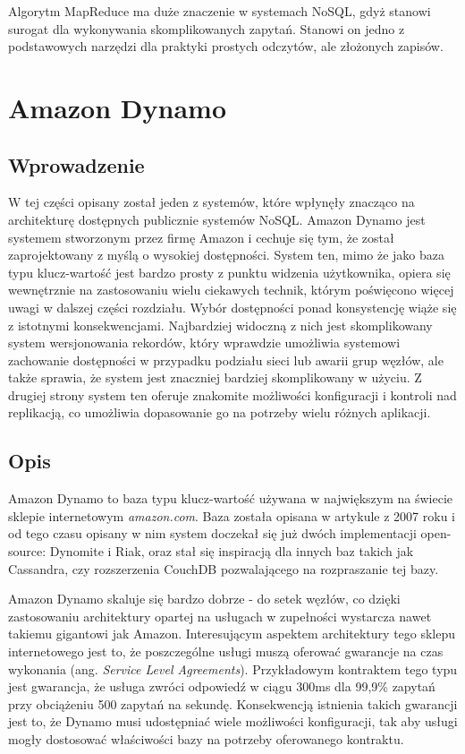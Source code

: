 Algorytm MapReduce ma duże znaczenie w systemach NoSQL, gdyż stanowi surogat dla wykonywania skomplikowanych zapytań.
Stanowi on jedno z podstawowych narzędzi dla praktyki prostych odczytów, ale złożonych zapisów.

\section{Amazon Dynamo}

\subsection*{Wprowadzenie}

W tej części opisany został jeden z systemów, które wpłynęły znacząco na architekturę dostępnych publicznie systemów NoSQL.
Amazon Dynamo jest systemem stworzonym przez firmę Amazon i cechuje się tym, że został zaprojektowany z myślą o wysokiej dostępności.
System ten, mimo że jako baza typu klucz-wartość jest bardzo prosty z punktu widzenia użytkownika, opiera się wewnętrznie na zastosowaniu wielu ciekawych technik, którym poświęcono więcej uwagi w dalszej części rozdziału.
Wybór dostępności ponad konsystencję wiąże się z istotnymi konsekwencjami.
Najbardziej widoczną z nich jest skomplikowany system wersjonowania rekordów, który wprawdzie umożliwia systemowi zachowanie dostępności w przypadku podziału sieci lub awarii grup węzłów, ale także sprawia, że system jest znaczniej bardziej skomplikowany w użyciu.
Z drugiej strony system ten oferuje znakomite możliwości konfiguracji i kontroli nad replikacją, co umożliwia dopasowanie go na potrzeby wielu różnych aplikacji.

\subsection*{Opis}

Amazon Dynamo to baza typu klucz-wartość używana w największym na świecie sklepie internetowym \emph{amazon.com}.
Baza została opisana w artykule z 2007 roku \cite{amazon-dynamo} i od tego czasu opisany w nim system doczekał się już dwóch implementacji open-source: Dynomite i Riak, oraz stał się inspiracją dla innych baz takich jak Cassandra, czy rozszerzenia CouchDB pozwalającego na rozpraszanie tej bazy.

Amazon Dynamo skaluje się bardzo dobrze - do setek węzłów, co dzięki zastosowaniu architektury opartej na usługach w zupełności wystarcza nawet takiemu gigantowi jak Amazon.
Interesującym aspektem architektury tego sklepu internetowego jest to, że poszczególne usługi muszą oferować gwarancje na czas wykonania (ang. \emph{Service Level Agreements}).
Przykładowym kontraktem tego typu jest gwarancja, że usługa zwróci odpowiedź w ciągu 300ms dla 99,9\% zapytań przy obciążeniu 500 zapytań na sekundę.
Konsekwencją istnienia takich gwarancji jest to, że Dynamo musi udostępniać wiele możliwości konfiguracji, tak aby usługi mogły dostosować właściwości bazy na potrzeby oferowanego kontraktu.

